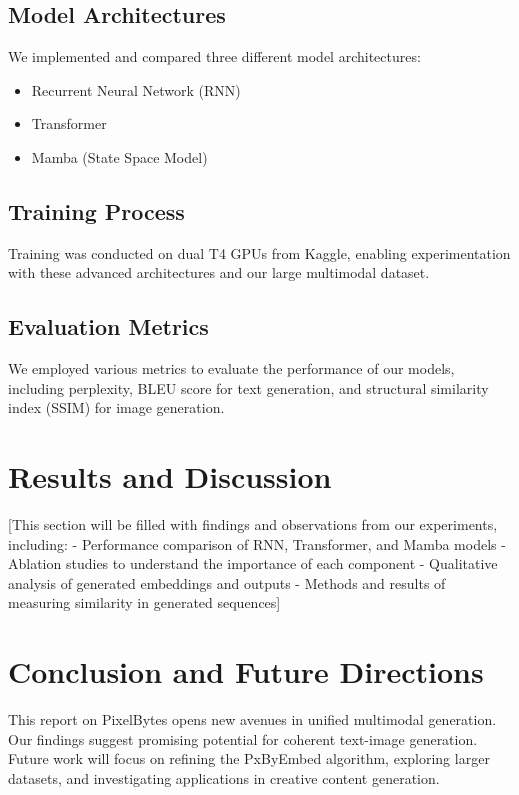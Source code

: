 \documentclass[10pt,a4paper]{article}
\begin{document}
\subsection{Model Architectures}
We implemented and compared three different model architectures:
\begin{itemize}
    \item Recurrent Neural Network (RNN)
    \item Transformer
    \item Mamba (State Space Model)
\end{itemize}

\subsection{Training Process}
Training was conducted on dual T4 GPUs from Kaggle, enabling experimentation with these advanced architectures and our large multimodal dataset.

\subsection{Evaluation Metrics}
We employed various metrics to evaluate the performance of our models, including perplexity, BLEU score for text generation, and structural similarity index (SSIM) for image generation.

\section{Results and Discussion}
[This section will be filled with findings and observations from our experiments, including:
- Performance comparison of RNN, Transformer, and Mamba models
- Ablation studies to understand the importance of each component
- Qualitative analysis of generated embeddings and outputs
- Methods and results of measuring similarity in generated sequences]

\section{Conclusion and Future Directions}
This report on PixelBytes opens new avenues in unified multimodal generation. Our findings suggest promising potential for coherent text-image generation. Future work will focus on refining the PxByEmbed algorithm, exploring larger datasets, and investigating applications in creative content generation.



\end{document}
